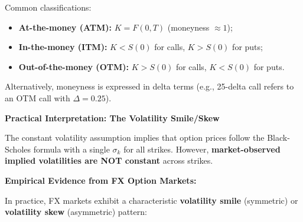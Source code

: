 Common classifications:
\begin{itemize}
	\item \textbf{At-the-money (ATM):} $K = F(0,T)$ (moneyness $\approx 1$);
	\item \textbf{In-the-money (ITM):} $K < S(0)$ for calls, $K > S(0)$ for puts;
	\item \textbf{Out-of-the-money (OTM):} $K > S(0)$ for calls, $K < S(0)$ for puts.
\end{itemize}

Alternatively, moneyness is expressed in delta terms (e.g., 25-delta call refers to an OTM call with $\Delta = 0.25$).

\textbf{Practical Interpretation: The Volatility Smile/Skew}

The constant volatility assumption implies that option prices follow the Black-Scholes formula with a single $\sigma_k$ for all strikes. However, \textbf{market-observed implied volatilities are NOT constant} across strikes.

\textbf{Empirical Evidence from FX Option Markets:}

In practice, FX markets exhibit a characteristic \textbf{volatility smile} (symmetric) or \textbf{volatility skew} (asymmetric) pattern:

